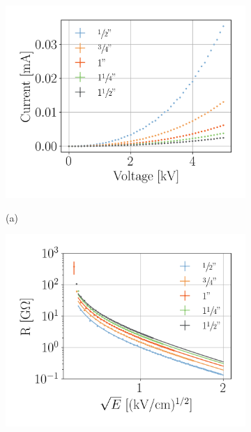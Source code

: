 \documentclass[a4paper,12pt]{article}
\begin{document}
\begin{figure}[htb]
\centering
\begin{subfigure}[c]{0.32\textheight}
	\begin{center}
		\includegraphics[width=\textwidth]{TLM_length_current.png}
		
		\vspace*{-\baselineskip} \hspace{1em} (a)
	\end{center}
\end{subfigure}
\begin{subfigure}[c]{0.32\textheight}
	\begin{center}
		\includegraphics[width=\textwidth]{TLM_length_resistance.png}
		

\end{center}
\end{subfigure}
\end{figure}
\end{document}

